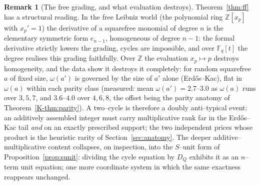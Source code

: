 \documentclass[11pt]{article}
\theoremstyle{definition}
\newtheorem{remark}[theorem]{Remark}
\begin{document}
\begin{remark}[The free grading, and what evaluation destroys]\label{rem:grading}
Theorem~\ref{thm:ff} has a structural reading. In the free Leibniz world (the polynomial ring
$\mathbb{Z}[x_p]$ with $x_p'=1$) the derivative of a squarefree monomial of degree $n$ is the
elementary symmetric form $e_{n-1}$, homogeneous of degree $n-1$: the formal derivative strictly lowers
the grading, cycles are impossible, and over $\mathbb{F}_q[t]$ the degree realises this grading
faithfully. Over $\mathbb{Z}$ the evaluation $x_p\mapsto p$ destroys homogeneity, and the data show it
destroys it completely: for random squarefree $a$ of fixed size, $\omega(a')$ is governed by the size of
$a'$ alone (Erd\H{o}s--Kac), flat in $\omega(a)$ within each parity class (measured: mean
$\omega(a')=2.7$--$3.0$ as $\omega(a)$ runs over $3,5,7$, and $3.6$--$4.0$ over $4,6,8$, the offset being
the parity anatomy of Theorem~\ref{K-thm:parity}). A two--cycle is therefore a doubly anti--typical event:
an additively assembled integer must carry multiplicative rank far in the Erd\H{o}s--Kac tail \emph{and}
on an exactly prescribed support; the two independent prices whose product is the heuristic rarity of
Section~\ref{sec:anatomy}. The deeper additive--multiplicative content collapses, on inspection, into
the $S$--unit form of Proposition~\ref{prop:sunit}: dividing the cycle equation by $D_Q$ exhibits it as
an $n$--term unit equation; one more coordinate system in which the same exactness reappears
unchanged.
\end{remark}
\end{document}
